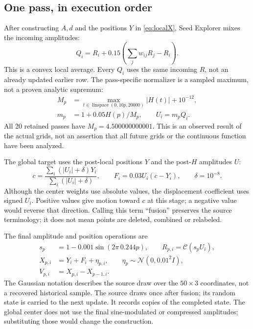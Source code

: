 \documentclass[11pt,a4paper]{article}
\newcommand{\C}{\mathcal{C}}
\begin{document}
\subsection{One pass, in execution order}
\label{sec:s4stages}
After constructing $A,d$ and the positions $Y$ in \eqref{eq:localX}, Seed Explorer mixes the incoming amplitudes:
\begin{equation}
Q_i=R_i+0.15\left(\sum_jw_{ij}R_j-R_i\right).
\label{eq:s4Q}
\end{equation}
This is a convex local average. Every $Q_i$ uses the same incoming $R$, not an already updated earlier row. The pass-specific normalizer is a sampled maximum, not a proven analytic supremum:
\begin{align}
 M_p&=\max_{t\in\operatorname{linspace}(0,10p,20000)}|H(t)|+10^{-12},\label{eq:M4}\\
 m_p&=1+0.05H(p)/M_p,\qquad U_i=m_pQ_i.\label{eq:s4U}
\end{align}
All 20 retained passes have $M_p=4.500000000001$. This is an observed result of the actual grids, not an assertion that all future grids or the continuous function have been analyzed.

The global target uses the post-local positions $Y$ and the post-$H$ amplitudes $U$:
\begin{equation}
c=\frac{\sum_i(|U_i|+\delta)Y_i}{\sum_i(|U_i|+\delta)},\qquad
F_i=0.03U_i(c-Y_i),\qquad \delta=10^{-8}.
\label{eq:fusion}
\end{equation}
Although the center weights use absolute values, the displacement coefficient uses signed $U_i$. Positive values give motion toward $c$ at this stage; a negative value would reverse that direction. Calling this term ``fusion'' preserves the source terminology; it does not mean points are deleted, combined or relabeled.

The final amplitude and position operations are
\begin{align}
s_p&=1-0.001\sin(2\pi\,0.244p),\qquad R_{p,i}=\C(s_pU_i),\label{eq:s4R}\\
X_{p,i}&=Y_i+F_i+\eta_{p,i},\qquad \eta_p\sim\mathcal N(0,0.01^2 I),\label{eq:s4X}\\
V_{p,i}&=X_{p,i}-X_{p-1,i}.\label{eq:V}
\end{align}
The Gaussian notation describes the source draw over the $50\times3$ coordinates, not a recovered historical sample. The source draws once after fusion; its random state is carried to the next update. It records copies of the completed state. The global center does not use the final sine-modulated or compressed amplitudes; substituting those would change the construction.
\end{document}
